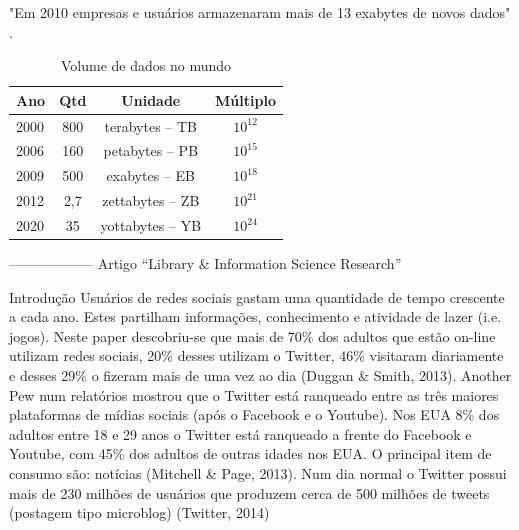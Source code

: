 "Em 2010 empresas e usuários armazenaram mais de 13 exabytes de novos dados" \cite{bigdataQualquerUm}.

\begin{table}[!ht]
\centering
\caption{Volume de dados no mundo}
\vspace{1mm}
\begin{tabular}{l|c|c|c}
\hline
\textbf{Ano} & \textbf{Qtd} & \textbf{Unidade} & \textbf{Múltiplo}\\
\hline
2000 & 800 & terabytes – TB & $10^{12}$\\
2006 & 160 & petabytes – PB & $10^{15}$\\
2009 & 500 & exabytes – EB & $10^{18}$ \\
2012 & 2,7 & zettabytes – ZB & $10^{21}$\\
2020 & 35 & yottabytes – YB & $10^{24}$\\
\end{tabular}
\end{table}

------------------
Artigo ``Library \& Information Science Research''

Introdução
Usuários de redes sociais gastam uma quantidade de tempo crescente a cada ano. 
Estes partilham informações, conhecimento e atividade de lazer (i.e. jogos).
Neste paper descobriu-se que mais de 70\% dos adultos que estão on-line utilizam redes sociais, 20\% desses utilizam o Twitter, 46\% visitaram diariamente e desses 29\% o fizeram mais de uma vez ao dia (Duggan \& Smith, 2013).
Another Pew num relatórios mostrou que o Twitter está ranqueado entre as três maiores plataformas de mídias sociais (após o Facebook e o Youtube). Nos EUA 8\% dos adultos entre 18 e 29 anos o Twitter está ranqueado a frente do Facebook e Youtube, com 45\% dos adultos de outras idades nos EUA. O principal item de consumo são: notícias (Mitchell \& Page, 2013). Num dia normal o Twitter possui mais de 230 milhões de usuários que produzem cerca de 500 milhões de tweets (postagem tipo microblog) (Twitter, 2014)


